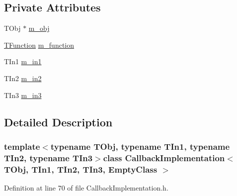 \subsection*{Private Attributes}
\begin{DoxyCompactItemize}
\item 
T\-Obj $\ast$ \hyperlink{class_callback_implementation_3_01_t_obj_00_01_t_in1_00_01_t_in2_00_01_t_in3_00_01_empty_class_01_4_accf9a294d8f7328f567951c4acade13b}{m\-\_\-obj}
\item 
\hyperlink{class_callback_implementation_3_01_t_obj_00_01_t_in1_00_01_t_in2_00_01_t_in3_00_01_empty_class_01_4_ae2effc19800057a6d73a828da5f26613}{T\-Function} \hyperlink{class_callback_implementation_3_01_t_obj_00_01_t_in1_00_01_t_in2_00_01_t_in3_00_01_empty_class_01_4_ad80fbd84a7b3a1fdd0874741f27487dd}{m\-\_\-function}
\item 
T\-In1 \hyperlink{class_callback_implementation_3_01_t_obj_00_01_t_in1_00_01_t_in2_00_01_t_in3_00_01_empty_class_01_4_afbc18229c67f23d55bd890ca9920231a}{m\-\_\-in1}
\item 
T\-In2 \hyperlink{class_callback_implementation_3_01_t_obj_00_01_t_in1_00_01_t_in2_00_01_t_in3_00_01_empty_class_01_4_a0f9b566ad182fe380b9b0b153fdbf6e0}{m\-\_\-in2}
\item 
T\-In3 \hyperlink{class_callback_implementation_3_01_t_obj_00_01_t_in1_00_01_t_in2_00_01_t_in3_00_01_empty_class_01_4_acbeca516a4e8e3eaf0aa67682855a4ab}{m\-\_\-in3}
\end{DoxyCompactItemize}


\subsection{Detailed Description}
\subsubsection*{template$<$typename T\-Obj, typename T\-In1, typename T\-In2, typename T\-In3$>$class Callback\-Implementation$<$ T\-Obj, T\-In1, T\-In2, T\-In3, Empty\-Class $>$}



Definition at line 70 of file Callback\-Implementation.\-h.




